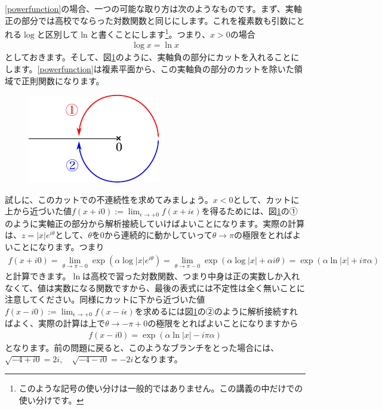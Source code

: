 \documentclass[report,paper=a4, fontsize=12pt, line_length=16cm, number_of_lines=33,dvipdfmx]{jlreq}
\numberwithin{equation}{section}
\begin{document}
\eqref{powerfunction}の場合、一つの可能な取り方は次のようなものです。まず、実軸正の部分では高校でならった対数関数と同じにします。これを複素数も引数にとれる$\log$と区別して$\ln$と書くことにします\footnote{このような記号の使い分けは一般的ではありません。この講義の中だけでの使い分けです。}。つまり、$x>0$の場合
\begin{align}
  \log x=\ln x
\end{align}
としておきます。そして、図\ref{fig:cutrealnegative}のように、実軸負の部分にカットを入れることにします。\eqref{powerfunction}は複素平面から、この実軸負の部分のカットを除いた領域で正則関数になります。
\begin{figure}[htbp]
  \centering
  \includegraphics{cutrealnegative.pdf}
  \caption{}
  \label{fig:cutrealnegative}
\end{figure}

試しに、このカットでの不連続性を求めてみましょう。$x<0$として、カットに上から近づいた値$f(x+i0):=\lim_{\epsilon\to +0}f(x+i\epsilon)$を得るためには、図\ref{fig:cutrealnegative}の①のように実軸正の部分から解析接続していけばよいことになります。実際の計算は、$z=|x|e^{i\theta}$として、$\theta$を$0$から連続的に動かしていって$\theta\to\pi$の極限をとればよいことになります。つまり
\begin{align}
  f(x+i0)
  =\lim_{\theta\to \pi -0} \exp(\alpha \log |x|e^{i\theta})
  =\lim_{\theta\to \pi -0} \exp(\alpha \log |x|+\alpha i\theta)
  =\exp(\alpha\ln|x|+i\pi \alpha)
\end{align}
と計算できます。$\ln$は高校で習った対数関数、つまり中身は正の実数しか入れなくて、値は実数になる関数ですから、最後の表式には不定性は全く無いことに注意してください。同様にカットに下から近づいた値$f(x-i0):=\lim_{\epsilon\to +0}f(x-i\epsilon)$を求めるには図\ref{fig:cutrealnegative}の②のように解析接続すればよく、実際の計算は上で$\theta\to -\pi+0$の極限をとればよいことになりますから
\begin{align}
  f(x-i0)=\exp(\alpha\ln|x|-i\pi \alpha)
\end{align}
となります。前の問題に戻ると、このようなブランチをとった場合には、$\sqrt{-4+i0}=2i,\quad\sqrt{-4-i0}=-2i$となります。
\end{document}
